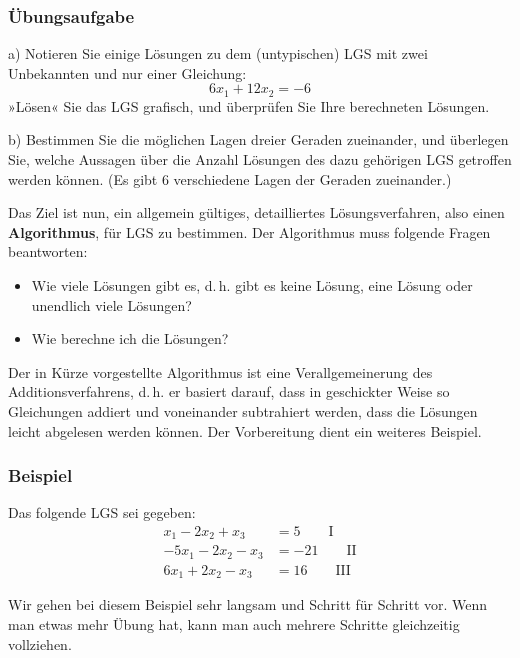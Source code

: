 \subsubsection{Übungsaufgabe}

\begin{graukasten}
  a) Notieren Sie einige Lösungen zu dem (untypischen) LGS mit zwei Unbekannten und nur einer Gleichung:
  \[ 6x_1 + 12x_2 = -6 \]
  »Lösen« Sie das LGS grafisch, und überprüfen Sie Ihre berechneten Lösungen.

  b) Bestimmen Sie die möglichen Lagen dreier Geraden zueinander, und überlegen Sie, welche Aussagen über die Anzahl Lösungen des dazu gehörigen LGS getroffen werden können. (Es gibt 6 verschiedene Lagen der Geraden zueinander.)
\end{graukasten}

Das Ziel ist nun, ein allgemein gültiges, detailliertes Lösungsverfahren, also einen \textbf{Algorithmus}, für LGS zu bestimmen. Der Algorithmus muss folgende Fragen beantworten:
\begin{itemize}
  \item Wie viele Lösungen gibt es, d.\,h. gibt es keine Lösung, eine Lösung oder unendlich viele Lösungen?
  \item Wie berechne ich die Lösungen?
\end{itemize}
Der in Kürze vorgestellte Algorithmus ist eine Verallgemeinerung des Additionsverfahrens, d.\,h. er basiert darauf, dass in geschickter Weise so Gleichungen addiert und voneinander subtrahiert werden, dass die Lösungen leicht abgelesen werden können.
Der Vorbereitung dient ein weiteres Beispiel.

\subsubsection{Beispiel}

Das folgende LGS sei gegeben:
\begin{align*}
  x_1 - 2x_2 + x_3 &= 5 \qquad \text{I}\\
  -5x_1 - 2x_2 - x_3 &= -21 \qquad \text{II}\\
  6x_1 + 2x_2 - x_3 &= 16 \qquad \text{III}
\end{align*}

Wir gehen bei diesem Beispiel sehr langsam und Schritt für Schritt vor. Wenn man etwas mehr Übung hat, kann man auch mehrere Schritte gleichzeitig vollziehen.

